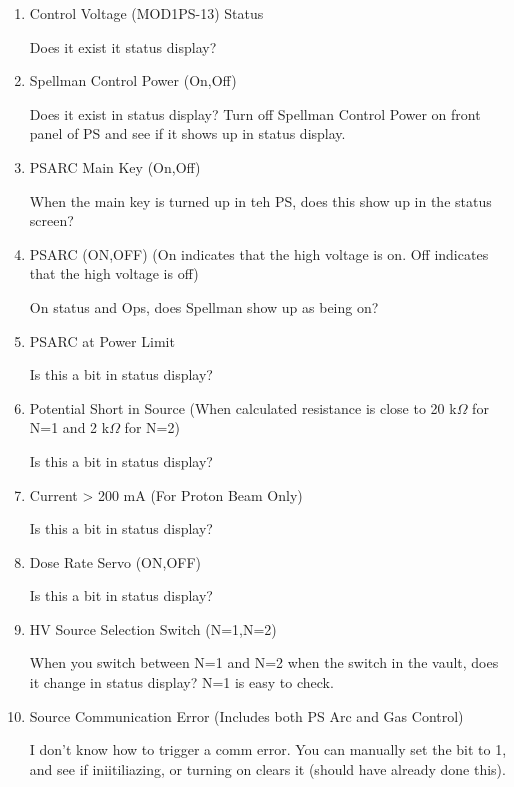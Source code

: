 \documentclass[11pt]{book}		%
\begin{document}
\begin{enumerate}
 \item Control Voltage (MOD1PS-13) Status

\color{red}
Does it exist it status display?
\color{black}

 \item Spellman Control Power (On,Off)

\color{red}
Does it exist in status display? Turn off Spellman Control Power on front panel of PS and see if it shows up in status display.
\color{black}

 \item PSARC Main Key (On,Off)

\color{red}
When the main key is turned up in teh PS, does this show up in the status screen?
\color{black}

 \item PSARC (ON,OFF) (On indicates that the high voltage is on.  Off indicates that the high voltage is off)

\color{red}
On status and Ops, does Spellman show up as being on?
\color{black}

 \item PSARC at Power Limit

\color{red}
Is this a bit in status display?
\color{black}

 \item Potential Short in Source (When calculated resistance is close to 20 k$\Omega$ for N=1 and 2 k$\Omega$ for N=2)

\color{red}
Is this a bit in status display?
\color{black}

 \item Current > 200 mA (For Proton Beam Only)

\color{red}
Is this a bit in status display?
\color{black}

 \item Dose Rate Servo (ON,OFF)

\color{red}
Is this a bit in status display?
\color{black}

 \item HV Source Selection Switch (N=1,N=2)

\color{red}
When you switch between N=1 and N=2 when the switch in the vault, does it change in status display? N=1 is easy to check.
\color{black}

 \item Source Communication Error (Includes both PS Arc and Gas Control)

\color{red}
I don't know how to trigger a comm error. You can manually set the bit to 1, and see if iniitiliazing, or turning on clears it (should have already done this).
\color{black}


\end{enumerate}
\end{document}

